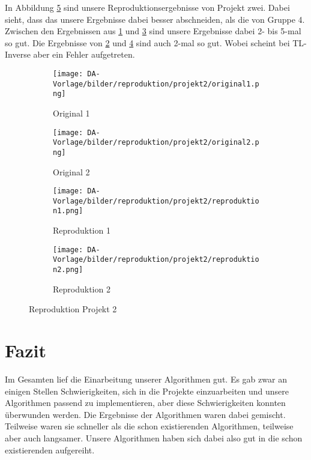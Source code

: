         In Abbildung \ref{fig:reproduktion_project_2} sind unsere Reproduktionsergebnisse von Projekt zwei. Dabei sieht, dass das unsere Ergebnisse dabei besser abschneiden, als die von Gruppe 4. Zwischen den Ergebnissen aus \ref{fig:reproduktion_project_2_original_1} und \ref{fig:reproduktion_project_2_reproduktion_1} sind unsere Ergebnisse dabei 2- bis 5-mal so gut. Die Ergebnisse von \ref{fig:reproduktion_project_2_original_2} und \ref{fig:reproduktion_project_2_reproduktion_2} sind auch 2-mal so gut. Wobei scheint bei TL-Inverse aber ein Fehler aufgetreten.
        
        \begin{figure}
            \centering
            \begin{subfigure}{0.45\textwidth}
                \centering
                \texttt{[image: DA-Vorlage/bilder/reproduktion/projekt2/original1.png]}
                \caption{Original 1}
                \label{fig:reproduktion_project_2_original_1}
            \end{subfigure}
            \begin{subfigure}{0.45\textwidth}
                \centering
                \texttt{[image: DA-Vorlage/bilder/reproduktion/projekt2/original2.png]}
                \caption{Original 2}
                \label{fig:reproduktion_project_2_original_2}
            \end{subfigure}
            \begin{subfigure}{0.45\textwidth}
                \centering
                \texttt{[image: DA-Vorlage/bilder/reproduktion/projekt2/reproduktion1.png]}
                \caption{Reproduktion 1}
                \label{fig:reproduktion_project_2_reproduktion_1}
            \end{subfigure}
            \begin{subfigure}{0.45\textwidth}
                \centering
                \texttt{[image: DA-Vorlage/bilder/reproduktion/projekt2/reproduktion2.png]}
                \caption{Reproduktion 2}
                \label{fig:reproduktion_project_2_reproduktion_2}
            \end{subfigure}
            
            \caption{Reproduktion Projekt 2}
            \label{fig:reproduktion_project_2}
        \end{figure}


\section{Fazit}
    Im Gesamten lief die Einarbeitung unserer Algorithmen gut. Es gab zwar an einigen Stellen Schwierigkeiten, sich in die Projekte einzuarbeiten und unsere Algorithmen passend zu implementieren, aber diese Schwierigkeiten konnten überwunden werden. Die Ergebnisse der Algorithmen waren dabei gemischt. Teilweise waren sie schneller als die schon existierenden Algorithmen, teilweise aber auch langsamer. Unsere Algorithmen haben sich dabei also gut in die schon existierenden aufgereiht. \\
    